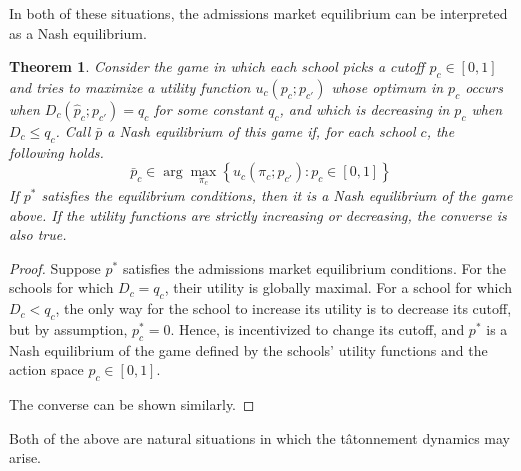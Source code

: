 \documentclass[12pt]{article}
\numberwithin{equation}{subsection}
\newtheorem{theorem}{Theorem}
\theoremstyle{definition}
\begin{document}
In both of these situations, the admissions market equilibrium can be interpreted as a Nash equilibrium. 
\begin{theorem}
Consider the game in which each school picks a cutoff $p_c \in [0,1]$ and tries to maximize a utility function $u_c(p_c; p_{c'})$ whose optimum in $p_c$ occurs when $D_c(\hat p_c; p_{c'}) = q_c$ for some constant $q_c$, and which is decreasing in $p_c$ when $D_c \leq q_c$. Call $\bar p$ a Nash equilibrium of this game if, for each school $c$, the following holds.
\[\bar p_c \in \arg \max_{\pi_c} \left\{ u_c(\pi_c; p_{c'}) : p_c \in [0,1] \right\}\]
If $p^*$ satisfies the equilibrium conditions, then it is a Nash equilibrium of the game above. If the utility functions are strictly increasing or decreasing, the converse is also true.
\end{theorem}
\begin{proof} Suppose $p^*$ satisfies the admissions market equilibrium conditions. For the schools for which $D_c = q_c$, their utility is globally maximal. For a school for which $D_c < q_c$, the only way for the school to increase its utility is to decrease its cutoff, but by assumption, $p_c^* = 0$. Hence, is incentivized to change its cutoff, and $p^*$ is a Nash equilibrium of the game defined by the schools' utility functions and the action space $p_c \in [0, 1]$.

The converse can be shown similarly.\end{proof}

Both of the above are natural situations in which the t\^{atonnement} dynamics may arise.
\end{document}
